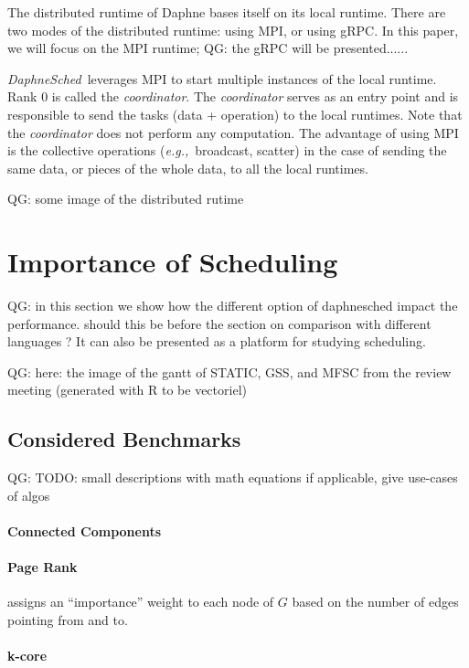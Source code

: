 \documentclass[conference,10pt,a4paper]{IEEEtran}
\newcommand{\eg}{\emph{e.g.,}}
\newcommand{\ds}{\emph{DaphneSched}}
\newcommand{\qg}[1]{{\color{blue} QG: #1}} %
\begin{document}
The distributed runtime of Daphne bases itself on its local runtime.
There are two modes of the distributed runtime: using MPI, or using gRPC.
In this paper, we will focus on the MPI runtime; \qg{the gRPC will be presented.....}.

\ds\ leverages MPI to start multiple instances of the local runtime.
Rank 0 is called the \emph{coordinator}.
The \emph{coordinator} serves as an entry point and is responsible to send the tasks (data + operation) to the local runtimes.
Note that the \emph{coordinator} does not perform any computation.
The advantage of using MPI is the collective operations (\eg\ broadcast, scatter) in the case of sending the same data, or pieces of the whole data, to all the local runtimes.


\qg{some image of the distributed rutime}


\section{Importance of Scheduling}

\qg{in this section we show how the different option of daphnesched impact the performance. should this be before the section on comparison with different languages ?
It can also be presented as a platform for studying scheduling.
}

\qg{here: the image of the gantt of STATIC, GSS, and MFSC from the review meeting (generated with R to be vectoriel)}

\subsection{Considered Benchmarks}

\qg{TODO: small descriptions with math equations if applicable, give use-cases of algos}

\paragraph{Connected Components}

\paragraph{Page Rank}

assigns an ``importance'' weight to each node of $G$ based on the number of edges pointing from and to.

\paragraph{k-core}
\end{document}
